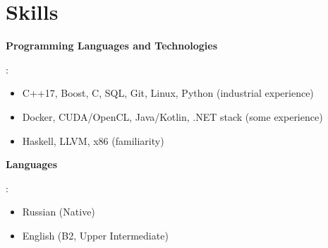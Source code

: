 \documentclass[letterpaper,10pt]{article}
\begin{document}
 \section{Skills}
 \begin{itemize}[leftmargin=0.15in, label={}]
 	\small{\item{
 			\textbf{Programming Languages and Technologies}{:
 				\begin{itemize}
 					\item C++17, Boost, C, SQL, Git, Linux, Python (industrial experience)
 					\item Docker, CUDA/OpenCL, Java/Kotlin, .NET stack (some experience)
 					\item Haskell, LLVM, x86 (familiarity)
 				\end{itemize} }

 			\textbf{Languages}{:\\ 
 				\begin{itemize}
 					\item Russian (Native)
 					\item English (B2, Upper Intermediate)
 				\end{itemize}}
 	}}
 \end{itemize}
\end{document}
